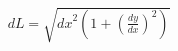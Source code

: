 \documentclass[preview]{standalone}
\begin{document}
\begin{align*}
dL = \sqrt{ {dx}^{2}(1+(\frac{dy}{dx})^{2}) }
\end{align*}
\end{document}
